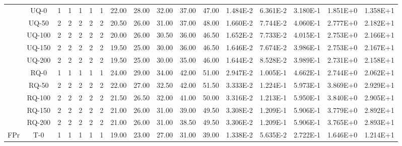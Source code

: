 \begin{table}[ht]
\begin{center}
{\begin{tabular}{cc|c|c|c|c|c|c|c|c|c|c|c|c|c|c|c|}
\cline{2-17}																														
\multicolumn{1}{|c|}{}                      & \multicolumn{1}{|c|}{UQ-0} &	1	&	1	&	1	&	1	&	1	&	22.00	&	28.00	&	32.00	&	37.00	&	47.00	&	1.484E-2	&	6.361E-2	&	3.180E-1	&	1.851E+0	&	1.358E+1	\\
\multicolumn{1}{|c|}{}                      & \multicolumn{1}{|c|}{UQ-50} &	2	&	2	&	2	&	2	&	2	&	20.50	&	26.00	&	31.00	&	37.00	&	48.00	&	1.660E-2	&	7.744E-2	&	4.060E-1	&	2.777E+0	&	2.182E+1	\\
\multicolumn{1}{|c|}{}                      & \multicolumn{1}{|c|}{UQ-100} &	2	&	2	&	2	&	2	&	2	&	20.00	&	26.00	&	30.50	&	36.00	&	46.50	&	1.652E-2	&	7.733E-2	&	4.015E-1	&	2.753E+0	&	2.166E+1	\\
\multicolumn{1}{|c|}{}                      & \multicolumn{1}{|c|}{UQ-150} &	2	&	2	&	2	&	2	&	2	&	19.50	&	25.00	&	30.00	&	36.00	&	46.50	&	1.646E-2	&	7.674E-2	&	3.986E-1	&	2.753E+0	&	2.167E+1	\\
\multicolumn{1}{|c|}{}                      & \multicolumn{1}{|c|}{UQ-200} &	2	&	2	&	2	&	2	&	2	&	19.50	&	25.00	&	30.00	&	35.00	&	46.00	&	1.644E-2	&	8.528E-2	&	3.989E-1	&	2.731E+0	&	2.158E+1	\\
\cline{2-17}																														
\multicolumn{1}{|c|}{}                      & \multicolumn{1}{|c|}{RQ-0} &	1	&	1	&	1	&	1	&	1	&	24.00	&	29.00	&	34.00	&	42.00	&	51.00	&	2.947E-2	&	1.005E-1	&	4.662E-1	&	2.744E+0	&	2.062E+1	\\
\multicolumn{1}{|c|}{}                      & \multicolumn{1}{|c|}{RQ-50} & 	2	&	2	&	2	&	2	&	2	&	22.00	&	27.00	&	32.50	&	42.00	&	51.50	&	3.333E-2	&	1.224E-1	&	5.973E-1	&	3.869E+0	&	2.929E+1	\\
\multicolumn{1}{|c|}{}                      & \multicolumn{1}{|c|}{RQ-100} &	2	&	2	&	2	&	2	&	2	&	21.50	&	26.50	&	32.00	&	41.00	&	50.00	&	3.316E-2	&	1.213E-1	&	5.950E-1	&	3.840E+0	&	2.905E+1	\\
\multicolumn{1}{|c|}{}                      & \multicolumn{1}{|c|}{RQ-150} &	2	&	2	&	2	&	2	&	2	&	21.00	&	26.00	&	31.00	&	39.00	&	49.50	&	3.308E-2	&	1.209E-1	&	5.906E-1	&	3.779E+0	&	2.892E+1	\\
\multicolumn{1}{|c|}{}                      & \multicolumn{1}{|c|}{RQ-200} & 	2	&	2	&	2	&	2	&	2	&	21.00	&	26.00	&	31.00	&	38.50	&	49.50	&	3.306E-2	&	1.209E-1	&	5.906E-1	&	3.765E+0	&	2.893E+1	\\
\cline{1-17}																														
\multicolumn{1}{|c|}{\multirow{15}{*}{FPr}} & \multicolumn{1}{|c|}{T-0} & 	1	&	1	&	1	&	1	&	1	&	19.00	&	23.00	&	27.00	&	31.00	&	39.00	&	1.338E-2	&	5.635E-2	&	2.722E-1	&	1.646E+0	&	1.214E+1	\\

\end{tabular}}
\end{center}
\end{table}
